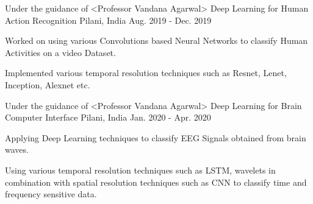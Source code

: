 

\begin{cventries}

  \cventry
    {Under the guidance of <Professor Vandana Agarwal>} %
    {Deep Learning for Human Action Recognition} %
    {Pilani, India} %
    {Aug. 2019 - Dec. 2019} %
    {
      \begin{cvitems} %
        \item {Worked on using various Convolutions based Neural Networks to classify Human Activities on a video Dataset.}
        \item {Implemented various temporal resolution techniques such as  Resnet, Lenet, Inception, Alexnet etc.}
      \end{cvitems}
    }

  \cventry
    {Under the guidance of <Professor Vandana Agarwal>} %
    {Deep Learning for Brain Computer Interface} %
    {Pilani, India} %
    {Jan. 2020 - Apr. 2020} %
    {
      \begin{cvitems} %
        \item {Applying Deep Learning techniques to classify EEG Signals obtained from brain waves.}
        \item {Using various temporal resolution techniques such as LSTM, wavelets in combination with spatial resolution techniques such as CNN to classify time and frequency sensitive data.}
      \end{cvitems}
    }


\end{cventries}
